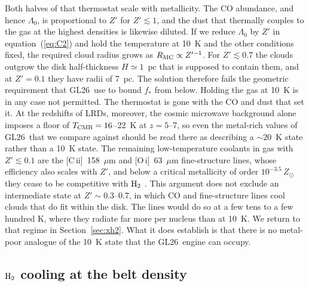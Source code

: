 \documentclass[twocolumn,pdftex]{aastex701}
\newcommand{\Zp}{Z'}
\newcommand{\fst}{f_{\ast}}
\newcommand{\GL}{GL26}
\newcommand{\Htwo}{{\rm H_2}}
\begin{document}
Both halves of that thermostat scale with metallicity. The CO abundance, and hence $\Lambda_0$, is proportional to $\Zp$ for $\Zp\lesssim1$, and the dust that thermally couples to the gas at the highest densities is likewise diluted. If we reduce $\Lambda_0$ by $\Zp$ in equation~(\ref{eq:C2}) and hold the temperature at 10~K and the other conditions fixed, the required cloud radius grows as $R_{\rm MC}\propto\Zp^{-1}$. For $\Zp\lesssim0.7$ the clouds outgrow the disk half-thickness $H\simeq1$~pc that is supposed to contain them, and at $\Zp = 0.1$ they have radii of 7~pc. The solution therefore fails the geometric requirement that \GL\ use to bound $\fst$ from below. Holding the gas at 10~K is in any case not permitted. The thermostat is gone with the CO and dust that set it. At the redshifts of LRDs, moreover, the cosmic microwave background alone imposes a floor of $T_{\rm CMB}=16$--22~K at $z=5$--7, so even the metal-rich values of \GL\ that we compare against should be read there as describing a $\sim20$~K state rather than a 10~K state. The remaining low-temperature coolants in gas with $\Zp\lesssim0.1$ are the [C\,{\sc ii}]~158~$\mu$m and [O\,{\sc i}]~63~$\mu$m fine-structure lines, whose efficiency also scales with $\Zp$, and below a critical metallicity of order $10^{-3.5}\,Z_\odot$ they cease to be competitive with $\Htwo$ \citep{Bromm:2003a,Omukai:2000a,Santoro:2006a,Glover:2007a}. This argument does not exclude an intermediate state at $\Zp\sim0.3$--0.7, in which CO and fine-structure lines cool clouds that do fit within the disk. The lines would do so at a few tens to a few hundred K, where they radiate far more per nucleus than at 10~K. We return to that regime in Section~\ref{sec:xh2}. What it does establish is that there is no metal-poor analogue of the 10~K state that the \GL\ engine can occupy.

\subsection{$\Htwo$ cooling at the belt density}\label{sec:h2cool}
\end{document}
